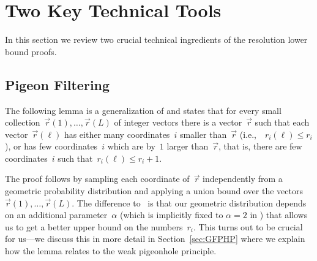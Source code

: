 \documentclass{theoretics}
\newcommand{\Nplus}     {\mathbb{N}^{+}}
\newcommand{\Floor}[1]{\bigl \lfloor #1 \bigr \rfloor}
\newcommand{\set}[1]{\{ #1 \}}
\newcommand{\setdescr}[3][\mid]{\set{ #2 #1 #3 }}
\newcommand{\Setsize}[1]{\bigl\lvert#1\bigr\rvert}
\newcommand{\eqperiod}{\enspace .}
\newcommand{\eqcomma}{\enspace ,}
\newcommand{\ie}{i.e.,\ }
\newcommand{\refsec}[1]{Section~\ref{#1}}
\newcommand{\indexvec}{\ell}
\newcommand{\nvecs}{L}
\newcommand{\ri}[1]{r_{#1}}
\newcommand{\riof}[2]{r_{#2}(#1)}
\newcommand{\vecr}{\vec{r}}
\newcommand{\vecrof}[1]{\vec{r}(#1)}
\newcommand{\vecrdef}[1]{\vecr = \left(\ri{1}, \ldots, \ri{#1}\right)}
\newcommand{\vecrofdef}[2]{\vecrof{#1} = 
\left(\riof{#1}{1}, \ldots, \riof{#1}{#2}\right)}
\newcommand{\squeezesubsection}[1]{\subsection{#1}}
\numberwithin{equation}{section}
\begin{document}
 
\section{Two Key Technical Tools}
\label{sec:filterandclosure}

In this section we review two crucial technical ingredients of the
resolution lower bound proofs.

\squeezesubsection{Pigeon Filtering}

The following lemma is a generalization of
\cite[Lemma~6]{Razborov03ResolutionLowerBoundsWFPHP} and states that
for every small collection~$\vecr(1), \ldots, \vecr(\nvecs)$ of
integer vectors there is a vector~$\vecr$ such that each
vector~$\vecr(\ell)$ has either many coordinates~$i$ smaller
than~$\vecr$ (\ie~$r_i(\ell) \leq r_i$), or has few coordinates~$i$
which are by~$1$ larger than~$\vecr$, that is, there are few
coordinates~$i$ such that~$r_i(\ell) \leq r_i+1$.

The proof follows by sampling each coordinate of~$\vecr$ independently
from a geometric probability distribution and applying a union bound
over the vectors $\vecr(1), \ldots, \vecr(\nvecs)$. The difference
to~\cite{Razborov03ResolutionLowerBoundsWFPHP} is that our geometric
distribution depends on an additional parameter~$\alpha$ (which is
implicitly fixed to $\alpha = 2$ in
\cite{Razborov03ResolutionLowerBoundsWFPHP}) that allows us to get a
better upper bound on the numbers~$\ri{i}$.  This turns out to be
crucial for us---we discuss this in more detail in \refsec{sec:GFPHP}
where we explain how the lemma relates to the weak pigeonhole
principle.

\end{document}
